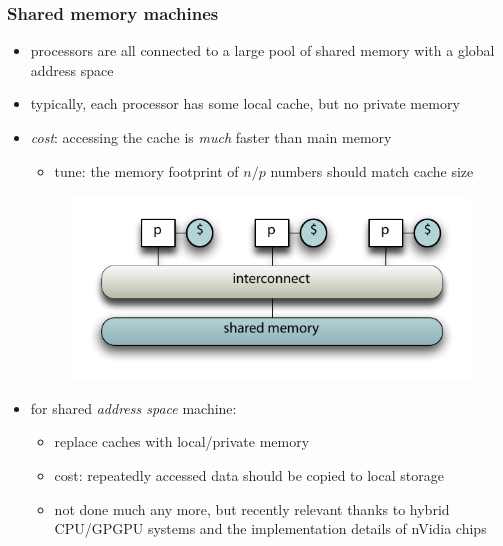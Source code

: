 \begin{frame}[fragile]
%
  \frametitle{Shared memory machines}
%
  \begin{itemize}
%
  \item processors are all connected to a large pool of shared memory with a global address
    space
  \item typically, each processor has some local cache, but no private memory
  \item {\em cost}: accessing the cache is {\em much} faster than main memory
    \begin{itemize}
      \item tune: the memory footprint of $n/p$ numbers should match cache size
    \end{itemize}
%
  \begin{figure}
    \centering
    \includegraphics[width=.5\linewidth]{figures/shared-memory.pdf}
    \label{fig:hared-memory}
  \end{figure}
%
  \item for shared {\em address space} machine:
    \begin{itemize}
      \item replace caches with local/private memory
      \item cost: repeatedly accessed data should be copied to local storage
      \item not done much any more, but recently relevant thanks to hybrid CPU/GPGPU systems and
        the implementation details of nVidia chips
    \end{itemize}
%
  \end{itemize}
%
\end{frame}


